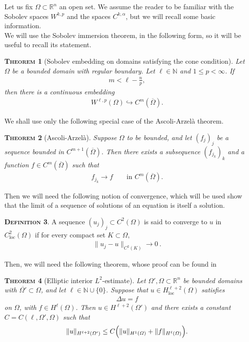 \documentclass[a4paper,11pt,openright,twoside]{book}
\renewcommand{\Omega}{\varOmega}
\newcommand{\R}{\mathbb{R}}
\newcommand{\1}{\mathds{1}}
\newcommand{\loc}{\mathrm{loc}}
\theoremstyle{plain}
\newtheorem{thm}{\textsc{Theorem}}[chapter]
\theoremstyle{definition}
\newtheorem{defn}[thm]{\textsc{Definition}}
\theoremstyle{remark}
\begin{document}
Let us fix $\Omega\subset \R^n$ an open set. We assume the reader to be familiar with the Sobolev spaces $W^{k,p}$ and the spaces $C^{k,\alpha}$, but we will recall some basic information.\\

We will use the Sobolev immersion theorem, in the following form, so it will be useful to recall its statement.
\begin{thm}[Sobolev embedding on domains satisfying the cone condition]\label{th:sobemb}
	Let $\Omega$ be a bounded domain with regular boundary. Let $\ell\in \mathbb N$ and $1\leq p<\infty$. If
	\begin{align*}
		m<\ell-\frac{n}{p},
	\end{align*}
	then there is a continuous embedding
	\begin{align*}
		W^{\ell,p}(\Omega)\hookrightarrow C^m(\overline{\Omega}).
	\end{align*}
\end{thm}
We shall use only the following special case of the Ascoli-Arzelà theorem.
\begin{thm}[Ascoli-Arzelà]\label{th:ascoli}
	Suppose $\Omega$ to be bounded, and let $(f_j)_j$ be a sequence
	bounded in $C^{m+1}(\overline{\Omega})$. Then there exists a subsequence
	$(f_{j_k})_k$ and a function $f\in C^m(\overline{\Omega})$ such that
	\begin{align*}
		f_{j_k}\to f \qquad \text{in } C^m(\overline{\Omega}).
	\end{align*}
\end{thm}

Then we will need the following notion of convergence, which will be used show that the limit of a sequence of solutions of an equation is itself a solution.
\begin{defn}
	A sequence $(u_j)_j\subset C^2(\Omega)$
	is said to converge to $u$ in $C^2_{\loc}(\Omega)$ if for every compact set $K\subset \Omega$,
	\begin{align*}
		\|u_j-u\|_{C^2(K)}\to 0\ .
	\end{align*}
\end{defn}

Then, we will need the following theorem, whose proof can be found in \cite{gilbarg_trudinger_1983} 
\begin{thm}[Elliptic interior $L^2$-estimate]\label{th:ellintestltwo}
	Let $\Omega',\Omega\subset \mathbb R^n$ be bounded domains with
	$\overline{\Omega'}\subset \Omega$, and let $\ell\in \mathbb N\cup\{0\}$. Suppose
	that $u\in H^{\ell+2}_{\loc}(\Omega)$ satisfies
	\begin{align*}
		\Delta u = f
	\end{align*}
	on $\Omega$, with $f\in H^\ell(\Omega)$. Then $u\in H^{\ell+2}(\Omega')$ and there
	exists a constant $C=C(\ell,\Omega',\Omega)$ such that
	\begin{align*}
		\|u\|_{H^{\ell+2}(\Omega')}
		\leq C\Bigl(\|u\|_{H^1(\Omega)}+\|f\|_{H^\ell(\Omega)}\Bigr).
	\end{align*}
\end{thm}
\end{document}
